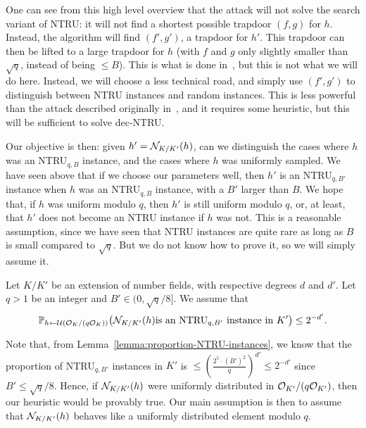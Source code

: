 One can see from this high level overview that the attack will not solve the search variant of NTRU: it will not find a shortest possible trapdoor $(f,g)$ for $h$. Instead, the algorithm will find $(f', g')$, a trapdoor for $h'$. This trapdoor can then be lifted to a large trapdoor for $h$ (with $f$ and $g$ only slightly smaller than $\sqrt{q}$, instead of being $\leq B$). This is what is done in~\cite{ABD16}, but this is not what we will do here. Instead, we will choose a less technical road, and simply use $(f',g')$ to distinguish between NTRU instances and random instances. This is less powerful than the attack described originally in~\cite{ABD16}, and it requires some heuristic, but this will be sufficient to solve dec-NTRU.

Our objective is then: given $h' = \mathcal{N}_{K/K'}(h)$, can we distinguish the cases where $h$ was an NTRU$_{q,B}$ instance, and the cases where $h$ was uniformly sampled. We have seen above that if we choose our parameters well, then $h'$ is an NTRU$_{q,B'}$ instance when $h$ was an NTRU$_{q,B}$ instance, with a $B'$ larger than $B$. We hope that, if $h$ was uniform modulo $q$, then $h'$ is still uniform modulo $q$, or, at least, that $h'$ does not become an NTRU instance if $h$ was not. This is a reasonable assumption, since we have seen that NTRU instances are quite rare as long as $B$ is small compared to $\sqrt{q}$. But we do not know how to prove it, so we will simply assume it.

\begin{heuristic}
\label{heuristic:NTRU}
Let $K/K'$ be an extension of number fields, with respective degrees $d$ and $d'$.
Let $q > 1$ be an integer and $B' \in (0,\sqrt{q}/8]$. We assume that
\[{\mathbb{P}}_{h \leftarrow \mathcal{U}(\mathcal{O}_K/(q\mathcal{O}_K))}\big( \mathcal{N}_{K/K'}(h) \text{is an NTRU$_{q,B'}$ instance in $K'$}\big) \leq 2^{-d'}.\]
\end{heuristic}

Note that, from Lemma~\ref{lemma:proportion-NTRU-instances}, we know that the proportion of NTRU$_{q,B'}$ instances in $K'$ is $\leq \left( \frac{2^5 \cdot (B')^2}{q}\right)^{d'} \leq 2^{-d'}$ since $B' \leq \sqrt{q}/8$. Hence, if $\mathcal{N}_{K/K'}(h)$ were uniformly distributed in $\mathcal{O}_{K'}/(q\mathcal{O}_{K'})$, then our heuristic would be provably true. Our main assumption is then to assume that $\mathcal{N}_{K/K'}(h)$ behaves like a uniformly distributed element modulo $q$.



